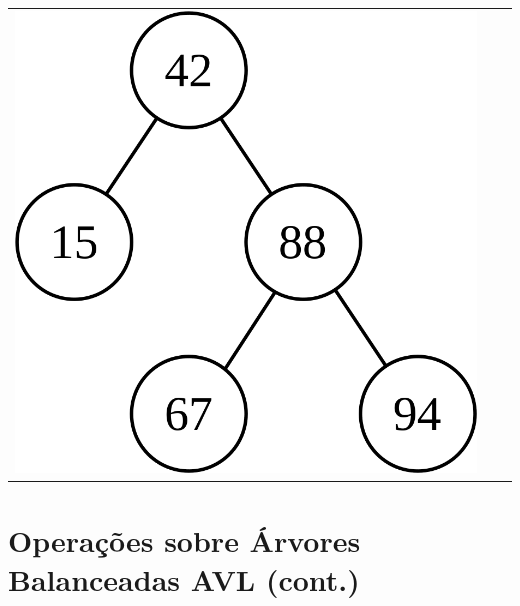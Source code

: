 \documentclass[aspectratio=169]{beamer}
\begin{document}
\begin{frame}[fragile]
\begin{enumerate}
\begin{tabular}{lll}
\includegraphics[height=0.3\paperheight]{imagens/avl20.png} \\
\end{tabular}
\end{enumerate}
\end{frame}

\section{Operações sobre Árvores Balanceadas AVL (cont.)}
\end{document}
